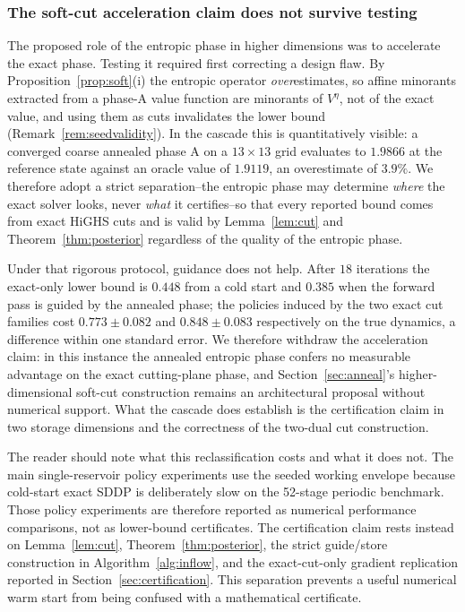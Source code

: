 \documentclass[pdflatex,sn-mathphys-num]{sn-jnl}
\theoremstyle{thmstyleone}
\theoremstyle{thmstyletwo}
\theoremstyle{thmstylethree}
\begin{document}
\subsubsection*{The soft-cut acceleration claim does not survive testing} The
proposed role of the entropic phase in higher dimensions was to accelerate
the exact phase. Testing it required first correcting a design flaw. By
Proposition~\ref{prop:soft}(i) the entropic operator \emph{over}estimates,
so affine minorants extracted from a phase-A value function are minorants
of $V^\eta$, not of the exact value, and using them as cuts invalidates the
lower bound (Remark~\ref{rem:seedvalidity}). In the cascade this is
quantitatively visible: a converged coarse annealed phase A on a
$13\times13$ grid evaluates to $1.9866$ at the reference state against an
oracle value of $1.9119$, an overestimate of $3.9\%$. We therefore adopt a
strict separation--the entropic phase may determine \emph{where} the exact
solver looks, never \emph{what} it certifies--so that every reported bound
comes from exact HiGHS cuts and is valid by Lemma~\ref{lem:cut} and
Theorem~\ref{thm:posterior} regardless of the quality of the entropic
phase.

Under that rigorous protocol, guidance does not help. After $18$
iterations the exact-only lower bound is $0.448$ from a cold start and
$0.385$ when the forward pass is guided by the annealed phase; the
policies induced by the two exact cut families cost $0.773\pm0.082$ and
$0.848\pm0.083$ respectively on the true dynamics, a difference within one
standard error. We therefore withdraw the acceleration claim: in this
instance the annealed entropic phase confers no measurable advantage on the
exact cutting-plane phase, and Section~\ref{sec:anneal}'s
higher-dimensional soft-cut construction remains an architectural proposal
without numerical support. What the cascade does establish is the
certification claim in two storage dimensions and the correctness of the
two-dual cut construction.

The reader should note what this reclassification costs and what it does not.
The main single-reservoir policy experiments use the seeded working envelope
because cold-start exact SDDP is deliberately slow on the 52-stage periodic
benchmark. Those policy experiments are therefore reported as numerical
performance comparisons, not as lower-bound certificates. The certification
claim rests instead on Lemma~\ref{lem:cut}, Theorem~\ref{thm:posterior}, the
strict guide/store construction in Algorithm~\ref{alg:inflow}, and the
exact-cut-only gradient replication reported in Section~\ref{sec:certification}.
This separation prevents a useful numerical warm start from being confused
with a mathematical certificate.
\end{document}
